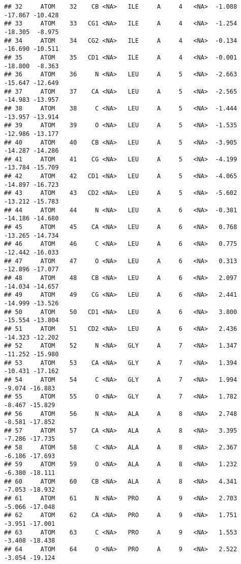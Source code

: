 \documentclass[
]{article}
\begin{document}
\begin{verbatim}
## 32     ATOM    32    CB <NA>   ILE     A     4   <NA>  -1.088 -17.867 -10.428
## 33     ATOM    33   CG1 <NA>   ILE     A     4   <NA>  -1.254 -18.305  -8.975
## 34     ATOM    34   CG2 <NA>   ILE     A     4   <NA>  -0.134 -16.690 -10.511
## 35     ATOM    35   CD1 <NA>   ILE     A     4   <NA>  -0.001 -18.800  -8.363
## 36     ATOM    36     N <NA>   LEU     A     5   <NA>  -2.663 -15.647 -12.649
## 37     ATOM    37    CA <NA>   LEU     A     5   <NA>  -2.565 -14.983 -13.957
## 38     ATOM    38     C <NA>   LEU     A     5   <NA>  -1.444 -13.957 -13.914
## 39     ATOM    39     O <NA>   LEU     A     5   <NA>  -1.535 -12.986 -13.177
## 40     ATOM    40    CB <NA>   LEU     A     5   <NA>  -3.905 -14.287 -14.286
## 41     ATOM    41    CG <NA>   LEU     A     5   <NA>  -4.199 -13.784 -15.709
## 42     ATOM    42   CD1 <NA>   LEU     A     5   <NA>  -4.065 -14.897 -16.723
## 43     ATOM    43   CD2 <NA>   LEU     A     5   <NA>  -5.602 -13.212 -15.783
## 44     ATOM    44     N <NA>   LEU     A     6   <NA>  -0.381 -14.186 -14.680
## 45     ATOM    45    CA <NA>   LEU     A     6   <NA>   0.768 -13.265 -14.734
## 46     ATOM    46     C <NA>   LEU     A     6   <NA>   0.775 -12.442 -16.033
## 47     ATOM    47     O <NA>   LEU     A     6   <NA>   0.313 -12.896 -17.077
## 48     ATOM    48    CB <NA>   LEU     A     6   <NA>   2.097 -14.034 -14.657
## 49     ATOM    49    CG <NA>   LEU     A     6   <NA>   2.441 -14.999 -13.526
## 50     ATOM    50   CD1 <NA>   LEU     A     6   <NA>   3.800 -15.554 -13.804
## 51     ATOM    51   CD2 <NA>   LEU     A     6   <NA>   2.436 -14.323 -12.202
## 52     ATOM    52     N <NA>   GLY     A     7   <NA>   1.347 -11.252 -15.980
## 53     ATOM    53    CA <NA>   GLY     A     7   <NA>   1.394 -10.431 -17.162
## 54     ATOM    54     C <NA>   GLY     A     7   <NA>   1.994  -9.074 -16.883
## 55     ATOM    55     O <NA>   GLY     A     7   <NA>   1.782  -8.467 -15.829
## 56     ATOM    56     N <NA>   ALA     A     8   <NA>   2.748  -8.581 -17.852
## 57     ATOM    57    CA <NA>   ALA     A     8   <NA>   3.395  -7.286 -17.735
## 58     ATOM    58     C <NA>   ALA     A     8   <NA>   2.367  -6.186 -17.693
## 59     ATOM    59     O <NA>   ALA     A     8   <NA>   1.232  -6.380 -18.111
## 60     ATOM    60    CB <NA>   ALA     A     8   <NA>   4.341  -7.053 -18.932
## 61     ATOM    61     N <NA>   PRO     A     9   <NA>   2.703  -5.066 -17.048
## 62     ATOM    62    CA <NA>   PRO     A     9   <NA>   1.751  -3.951 -17.001
## 63     ATOM    63     C <NA>   PRO     A     9   <NA>   1.553  -3.408 -18.438
## 64     ATOM    64     O <NA>   PRO     A     9   <NA>   2.522  -3.054 -19.124

\end{verbatim}
\end{document}
